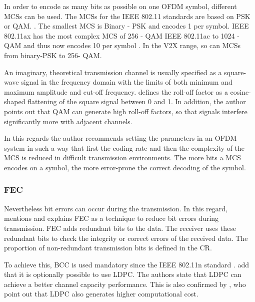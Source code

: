 In order to encode as many bits as possible on one \ac{OFDM} symbol, different \ac{MCS}s can be used.
The \ac{MCS}s for the IEEE 802.11 standards are based on \ac{PSK} or \ac{QAM}. \cite{kauffels_wireless_2002}. 
The smallest \ac{MCS} is Binary - \ac{PSK} and encodes \SI{1}{\bit} per symbol. IEEE 802.11ax has the most complex \ac{MCS} of \num{256} - \ac{QAM} IEEE 802.11ac to \num{1024} - \ac{QAM} and thus now encodes \SI{10}{\bit} per symbol \cite{afaqui_ieee_2017}.
In the \ac{V2X} range, so can \ac{MCS}s from binary-\ac{PSK} to \num{256}- \ac{QAM}.

An imaginary, theoretical transmission channel is usually specified as a square-wave signal in the frequency domain with the limits of both minimum and maximum amplitude and cut-off frequency. \textcite{kauffels_wireless_2002} defines the roll-off factor as a cosine-shaped flattening of the square signal between 0 and 1. In addition, the author points out that \ac{QAM} can generate high roll-off factors, so that signals interfere significantly more with adjacent channels.

In this regards the author recommends setting the parameters in an \ac{OFDM} system in such a way that first the coding rate and then the complexity of the \ac{MCS} is reduced in difficult transmission environments. The more bits a \ac{MCS} encodes on a symbol, the more error-prone the correct decoding of the symbol.

\subsubsection*{\acf{FEC}}

Nevertheless bit errors can occur during the transmission. In this regard, \cite{kauffels_wireless_2002}
mentions and explains \ac{FEC} as a technique to reduce bit errors during transmission. \ac{FEC} adds redundant bits
to the data. The receiver uses these redundant bits to check the integrity or correct errors of the received data.
The proportion of non-redundant transmission bits is defined in the \ac{CR}.

To achieve this, \ac{BCC} is used mandatory since the IEEE 802.11n standard \cite{afaqui_ieee_2017}
\cite{syafei_performance_2009}. \textcite{syafei_performance_2009} add that it is optionally possible to
use \ac{LDPC}. The authors state that \ac{LDPC} can achieve a better channel capacity performance.
This is also confirmed by \textcite{afaqui_ieee_2017}, who point out that \ac{LDPC} also generates higher computational cost.

